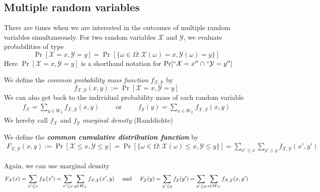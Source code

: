 \newpage
\subsection{Multiple random variables}
There are times when we are interested in the outcomes of multiple random variables simultaneously. For two random variables $\mathcal{X}$ and $\mathcal{Y}$, we evaluate probabilities of type
\[
    \Pr[\mathcal{X} = x, \mathcal{Y} = y] = \Pr[\{ \omega \in \Omega : \mathcal{X}(\omega) = x, \mathcal{Y}(\omega) = y \}]
\]
Here $\Pr[\mathcal{X} = x, \mathcal{Y} = y]$ is a shorthand notation for $\Pr[``\mathcal{X} = x'' \cap ``\mathcal{Y} = y'']$

We define the \textit{common probability mass function} $f_{\mathcal{X}, \mathcal{Y}}$ by
\[
    f_{\mathcal{X}, \mathcal{Y}}(x, y) := \Pr[\mathcal{X} = x, \mathcal{Y} = y]
\]
We can also get back to the individual probability mass of each random variable
\begin{align*}
    f_{\mathcal{X}} = \sum_{y \in W_{\mathcal{Y}}} f_{\mathcal{X}, \mathcal{Y}}(x, y) \hspace{1cm} \text{or} \hspace{1cm} f_{\mathcal{Y}}(y) = \sum_{x \in W_{\mathcal{X}}} f_{\mathcal{X}, \mathcal{Y}}(x, y)
\end{align*}
We hereby call $f_{\mathcal{X}}$ and $f_{\mathcal{Y}}$ \textit{marginal density} (Randdichte)

We define the \textbf{\textit{common cumulative distribution function}} by
\begin{align*}
    F_{\mathcal{X}, \mathcal{Y}}(x, y) := \Pr[\mathcal{X} \leq x, \mathcal{Y} \leq y] = \Pr[\{ \omega \in \Omega : \mathcal{X}(\omega) \leq x, \mathcal{Y} \leq y \}] = \sum_{x' \leq x} \sum_{y' \leq y} f_{\mathcal{X}, \mathcal{Y}}(x', y')
\end{align*}

Again, we can use marginal density
\begin{align*}
    F_{\mathcal{X}}(x) = \sum_{x'\leq x} f_{\mathcal{X}}(x') = \sum_{x' \leq x} \sum_{y \in W_{\mathcal{Y}}} f_{\mathcal{X}, \mathcal{Y}}(x', y)
    \hspace{5mm} \text{and} \hspace{5mm}
    F_{\mathcal{Y}}(y) = \sum_{y'\leq y} f_{\mathcal{Y}}(y') = \sum_{y' \leq y} \sum_{x \in W_{\mathcal{X}}} f_{\mathcal{X}, \mathcal{Y}}(x, y')
\end{align*}

